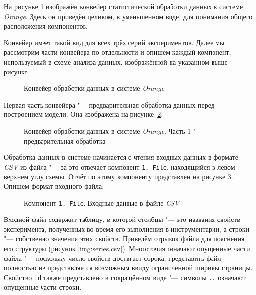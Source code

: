 На рисунке \ref{img:series30} изображён конвейер статистической обработки данных в системе \textit{Orange}. Здесь он приведён целиком, в уменьшенном виде, для понимания общего расположения компонентов.

Конвейер имеет такой вид для всех трёх серий экспериментов. Далее мы рассмотрим части конвейера по отдельности и опишем каждый компонент, используемый в схеме анализа данных, изображённой на указанном выше рисунке.

\begin{figure}[tbp]
    \caption{Конвейер обработки данных в системе \textit{Orange}}
    \label{img:series30}
\end{figure}

Первая часть конвейера "--- предварительная обработка данных перед построением модели. Она изображена на рисунке~\ref{img:series30-1}.

\begin{figure}[tbp]
    \caption{Конвейер обработки данных в системе \textit{Orange}. Часть 1 "--- предварительная обработка}
    \label{img:series30-1}
\end{figure}

Обработка данных в системе начинается с чтения входных данных в формате \textit{CSV} из файла "--- за это отвечает компонент \texttt{1.\,File}, находящийся в левом верхнем углу схемы. Отчёт по этому компоненту представлен на рисунке \ref{img:1-File}. Опишем формат входного файла.

\begin{figure}[tbp]
    \caption{Компонент \texttt{1.\,File}. Входные данные в файле \textit{CSV}}
    \label{img:1-File}
\end{figure}

Входной файл содержит таблицу, в которой столбцы "--- это названия свойств эксперимента, полученных во время его выполнения в инструментарии, а строки "--- собственно значения этих свойств. Приведём отрывок файла для пояснения его структуры (рисунок \ref{img:series.csv}). Многоточия означают опущенные части файла "--- поскольку число свойств достигает сорока, представить файл полностью не представляется возможным ввиду ограниченной ширины страницы. Свойство \texttt{id} также представлено в сокращённом виде "--- символы \texttt{..} означают опущенные части строки.

